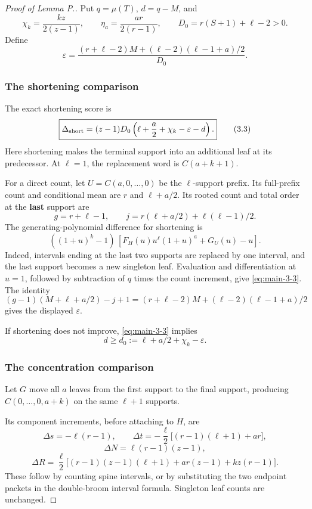 \documentclass[11pt,reqno]{amsart}
\theoremstyle{plain}
\begin{document}
\begin{proof}[Proof of Lemma P.]

Put \(q=\mu(T)\), \(d=q-M\), and \[
\chi_k=\frac{kz}{2(z-1)},\qquad
\eta_a=\frac{ar}{2(r-1)},\qquad
D_0=r(S+1)+\ell-2>0.
\] Define \[
\varepsilon=
\frac{(r+\ell-2)M+(\ell-2)(\ell-1+a)/2}{D_0}.
\tag{3.2}\label{eq:main-3-2}
\]

\subsubsection*{The shortening comparison}\label{the-shortening-comparison}

The exact shortening score is \[
\boxed{
\Delta_{\rm short}
=(z-1)D_0\left(\ell+\frac a2+\chi_k-\varepsilon-d\right).
}
\tag{3.3}\label{eq:main-3-3}
\] Here shortening makes the terminal support into an additional leaf at its predecessor. At \(\ell=1\), the replacement word is \(C(a+k+1)\).

For a direct count, let \(U=C(a,0,\ldots,0)\) be the \(\ell\)-support prefix. Its full-prefix count and conditional mean are \(r\) and \(\ell+a/2\). Its rooted count and total order at the \textbf{last} support are \[
g=r+\ell-1,\qquad j=r(\ell+a/2)+\ell(\ell-1)/2.
\] The generating-polynomial difference for shortening is \[
((1+u)^k-1)\,[F_H(u)u^{\ell}(1+u)^a+G_U(u)-u].
\] Indeed, intervals ending at the last two supports are replaced by one interval, and the last support becomes a new singleton leaf. Evaluation and differentiation at \(u=1\), followed by subtraction of \(q\) times the count increment, give \eqref{eq:main-3-3}. The identity \[
(g-1)(M+\ell+a/2)-j+1
=(r+\ell-2)M+(\ell-2)(\ell-1+a)/2
\] gives the displayed \(\varepsilon\).

If shortening does not improve, \eqref{eq:main-3-3} implies \[
d\ge d_0:=\ell+a/2+\chi_k-\varepsilon.
\tag{3.4}\label{eq:main-3-4}
\]

\subsubsection*{The concentration comparison}\label{the-concentration-comparison}

Let \(G\) move all \(a\) leaves from the first support to the final support, producing \(C(0,\ldots,0,a+k)\) on the same \(\ell+1\) supports.

Its component increments, before attaching to \(H\), are \[
\Delta s=-\ell(r-1),\qquad
\Delta t=-\frac{\ell}{2}\bigl[(r-1)(\ell+1)+ar\bigr],
\] \[
\Delta N=\ell(r-1)(z-1),
\] \[
\Delta R=\frac{\ell}{2}
\bigl[(r-1)(z-1)(\ell+1)+ar(z-1)+kz(r-1)\bigr].
\tag{3.5}\label{eq:main-3-5}
\] These follow by counting spine intervals, or by substituting the two endpoint packets in the double-broom interval formula. Singleton leaf counts are unchanged.


\end{proof}
\end{document}
